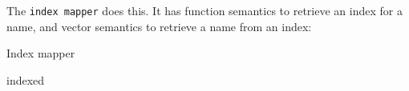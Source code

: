 The {\tt index mapper} does this.
It has function semantics to retrieve an index for a name,
and vector semantics to retrieve a name from an index:
\begin{algorithm}{Index mapper}
\end{algorithm}

\begin{algorithm}{indexed}
\end{algorithm}

\begin{sourceslandscape}
\end{sourceslandscape}
